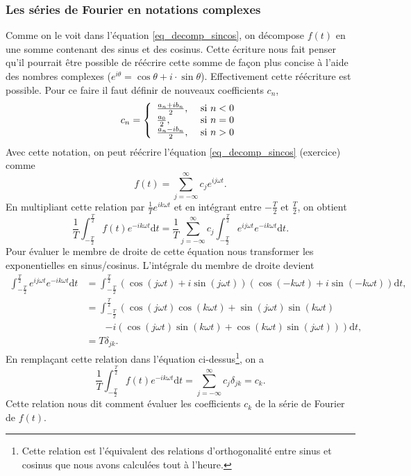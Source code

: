 \documentclass[a4paper,12pt]{book}
\newcommand{\dd}{\mathrm{d}}
\begin{document}
\subsubsection{Les séries de Fourier en notations complexes}
Comme on le voit dans l'équation \eqref{eq_decomp_sincos}, on décompose $f(t)$ en une somme contenant des sinus et des cosinus. 
Cette écriture nous fait penser qu'il pourrait être possible de réécrire cette somme de façon plus concise à l'aide des nombres complexes
($e^{i\theta}=\cos\theta+i\cdot\sin\theta$). Effectivement cette réécriture est possible. Pour ce faire il faut définir 
de nouveaux coefficients $c_n$,
\begin{equation}
 c_n=\left\{\begin{array}{ll}
                \frac{a_n+ib_n}{2}, & $\mbox{ si }$n<0\\
                \frac{a_0}{2},      & $\mbox{ si }$n=0\\
                \frac{a_n-ib_n}{2}, & $\mbox{ si }$n>0
               \end{array}\right.
\end{equation}
Avec cette notation, on peut réécrire l'équation \eqref{eq_decomp_sincos} (exercice) comme
\begin{equation}
 f(t)=\sum_{j=-\infty}^\infty c_je^{ij\omega t}.
\end{equation}
En multipliant cette relation par $\frac{1}{T}e^{ik\omega t}$ et en intégrant entre $-\frac{T}{2}$ et $\frac{T}{2}$, 
on obtient
\begin{equation}
 \frac{1}{T}\int_{-\frac{T}{2}}^{\frac{T}{2}}f(t)e^{-ik\omega t}\dd t=\frac{1}{T}\sum_{j=-\infty}^\infty c_j\int_{-\frac{T}{2}}^{\frac{T}{2}}e^{ij\omega t}e^{-ik\omega t}\dd t.
\end{equation}
Pour évaluer le membre de droite de cette équation nous transformer les exponentielles en sinus/cosinus. L'intégrale du membre de droite devient
\begin{align}
\int_{-\frac{T}{2}}^{\frac{T}{2}}e^{ij\omega t}e^{-ik\omega t}\dd t&=\int_{-\frac{T}{2}}^{\frac{T}{2}}\left(\cos(j\omega t)+i\sin(j\omega t)\right)\left(\cos(-k\omega t)+i\sin(-k\omega t)\right)\dd t,\nonumber\\
&=\int_{-\frac{T}{2}}^{\frac{T}{2}}\left(\cos(j\omega t)\cos(k\omega t)+\sin(j\omega t)\sin(k\omega t)\right.\nonumber\\
&\quad\quad\left.-i(\cos(j\omega t)\sin(k\omega t)+\cos(k\omega t)\sin(j\omega t))\right)\dd t,\nonumber\\
&=T\delta_{jk}.
\end{align}
En remplaçant cette relation dans l'équation ci-dessus\footnote{Cette relation est l'équivalent des relations d'orthogonalité entre sinus et cosinus que nous avons calculées tout à l'heure.}, 
on a
\begin{equation}
 \frac{1}{T}\int_{-\frac{T}{2}}^{\frac{T}{2}}f(t)e^{-ik\omega t}\dd t=\sum_{j=-\infty}^\infty c_j\delta_{jk}=c_k.\label{eq_ck}
\end{equation}
Cette relation nous dit comment évaluer les coefficients $c_k$ de la série de Fourier de $f(t)$.
\end{document}
